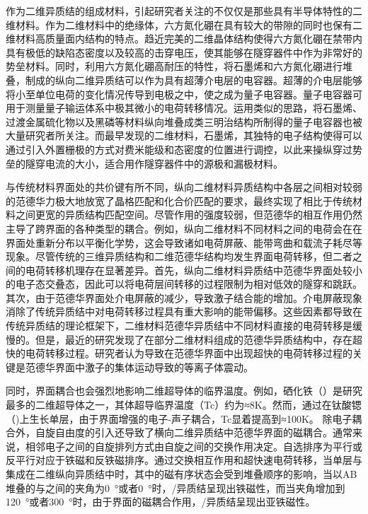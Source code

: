     作为二维异质结的组成材料，引起研究者关注的不仅仅是那些具有半导体特性的二维材料。作为二维材料中的绝缘体，六方氮化硼在具有较大的带隙的同时也保有二维材料高质量面内结构的特点。趋近完美的二维晶体结构使得六方氮化硼在禁带内具有极低的缺陷态密度以及较高的击穿电压，使其能够在隧穿器件中作为非常好的势垒材料。同时，利用六方氮化硼高耐压的特性，将石墨烯和六方氮化硼进行堆叠，制成的纵向二维异质结可以作为具有超薄介电层的电容器。超薄的介电层能够将小至单位电荷的变化情况传导到电极之中，使之成为量子电容器。量子电容器可用于测量量子输运体系中极其微小的电荷转移情况。运用类似的思路，将石墨烯、过渡金属硫化物以及黑磷等材料纵向堆叠成类三明治结构所制得的量子电容器也被大量研究者所关注。而最早发现的二维材料，石墨烯，其独特的电子结构使得可以通过引入外置栅极的方式对费米能级和态密度的位置进行调控，以此来操纵穿过势垒的隧穿电流的大小，适合用作隧穿器件中的源极和漏极材料。

    与传统材料界面处的共价键有所不同，纵向二维材料异质结构中各层之间相对较弱的范德华力极大地放宽了晶格匹配和化合价匹配的要求，最终实现了相比于传统材料之间更宽的异质结构匹配空间。尽管作用的强度较弱，但范德华的相互作用仍然主导了跨界面的各种类型的耦合。例如，纵向二维材料不同材料之间的电荷会在在界面处重新分布以平衡化学势，这会导致诸如电荷屏蔽、能带弯曲和载流子耗尽等现象。尽管传统的三维异质结构和二维范德华结构均发生界面电荷转移，但二者之间的电荷转移机理存在显著差异。首先，纵向二维材料异质结中范德华界面处较小的电子态交叠态，因此可以将电荷层间转移的过程限制为相对低效的隧穿和跳跃。其次，由于范德华界面处介电屏蔽的减少，导致激子结合能的增加。介电屏蔽现象消除了传统异质结中对电荷转移过程具有重大影响的能带偏移。这些因素都导致在传统异质结的理论框架下，二维材料范德华异质结中不同材料直接的电荷转移是缓慢的。但是，最近的研究发现了在部分二维材料组成的范德华异质结构中，存在超快的电荷转移过程。研究者认为导致在范德华界面中出现超快的电荷转移过程的关键是范德华界面中激子的集体运动导致的等离子体震动。

    同时，界面耦合也会强烈地影响二维超导体的临界温度。例如，硒化铁（）是研究最多的二维超导体之一，其体超导临界温度（Tc）约为≈8K。然而，通过在钛酸锶（)上生长单层，由于界面增强的电子-声子耦合，Tc显着提高到≈100K。%
    除电子耦合外，自旋自由度的引入还导致了横向二维异质结中范德华界面的磁耦合。通常来说，相邻电子之间的自旋排列方式由自旋之间的交换作用决定。自选排序为平行或反平行对应于铁磁和反铁磁排序。通过交换相互作用和超快速电荷转移，当单层与集成在二维纵向异质结中时，其中的磁有序状态会受到堆叠顺序的影响，当以AB堆叠的与之间的夹角为\SI{0}{\degree}或者\SI{0}{\degree}时，/异质结呈现出铁磁性，而当夹角增加到\SI{120}{\degree}或者\SI{300}{\degree}时，由于界面的磁耦合作用，/异质结呈现出亚铁磁性。%

